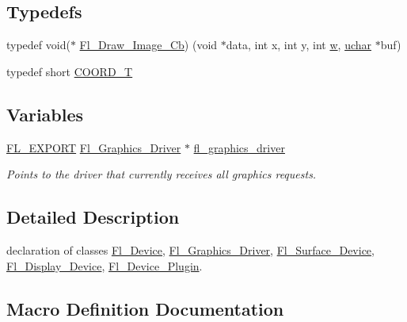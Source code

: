 \subsection*{Typedefs}
\begin{DoxyCompactItemize}
\item 
typedef void($\ast$ \hyperlink{_fl___device_8_h_a702e2cb8dd542dda67e5c206b0d73a07}{Fl\+\_\+\+Draw\+\_\+\+Image\+\_\+\+Cb}) (void $\ast$data, int x, int y, int \hyperlink{forms_8_h_aac374e320caaadeca4874add33b62af2}{w}, \hyperlink{fl__types_8h_a65f85814a8290f9797005d3b28e7e5fc}{uchar} $\ast$buf)
\item 
typedef short \hyperlink{_fl___device_8_h_a80f9cf99cc19414c003f11fbf88aaca6}{C\+O\+O\+R\+D\+\_\+T}
\end{DoxyCompactItemize}
\subsection*{Variables}
\begin{DoxyCompactItemize}
\item 
\hyperlink{_fl___export_8_h_aa9ba29a18aee9d738370a06eeb4470fc}{F\+L\+\_\+\+E\+X\+P\+O\+RT} \hyperlink{class_fl___graphics___driver}{Fl\+\_\+\+Graphics\+\_\+\+Driver} $\ast$ \hyperlink{_fl___device_8_h_a70e4f05429b26bb420c70f64e972f2a5}{fl\+\_\+graphics\+\_\+driver}
\begin{DoxyCompactList}\small\item\em Points to the driver that currently receives all graphics requests. \end{DoxyCompactList}\end{DoxyCompactItemize}


\subsection{Detailed Description}
declaration of classes \hyperlink{class_fl___device}{Fl\+\_\+\+Device}, \hyperlink{class_fl___graphics___driver}{Fl\+\_\+\+Graphics\+\_\+\+Driver}, \hyperlink{class_fl___surface___device}{Fl\+\_\+\+Surface\+\_\+\+Device}, \hyperlink{class_fl___display___device}{Fl\+\_\+\+Display\+\_\+\+Device}, \hyperlink{class_fl___device___plugin}{Fl\+\_\+\+Device\+\_\+\+Plugin}. 



\subsection{Macro Definition Documentation}
\mbox{\label{_fl___device_8_h_a28fb61d3423470d0c1220ca380551077}} 
